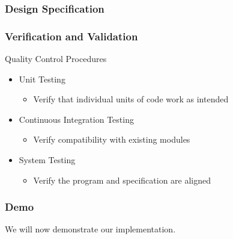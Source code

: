 \documentclass[t,12pt,numbers,fleqn]{beamer}
\begin{document}
\begin{frame}
\frametitle{Design Specification}
    
\end{frame}
\begin{frame}


\frametitle{Verification and Validation}
Quality Control Procedures
\begin{itemize}
    \item Unit Testing
    \begin{itemize}
        \item Verify that individual units of code work as intended
    \end{itemize}
    \item Continuous Integration Testing
    \begin{itemize}
        \item Verify compatibility with existing modules
    \end{itemize}
    \item System Testing
    \begin{itemize}
        \item Verify the program and specification are aligned
    \end{itemize}
\end{itemize}
\end{frame}
\begin{frame}
\frametitle{Demo}
We will now demonstrate our implementation.
\end{frame}
\end{document}
